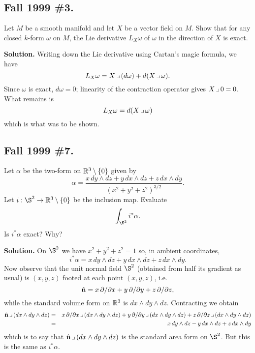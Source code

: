 \documentclass[10pt]{article}
\numberwithin{equation}{subsection}
\begin{document}
\subsection{Fall 1999 \#3.}

Let $M$ be a smooth manifold and let $X$ be a vector field on $M$.  Show that
for any closed $k$-form $\omega$ on $M$, the Lie derivative $L_X\omega$ of
$\omega$ in the direction of $X$ is exact.

\textbf{Solution.}  Writing down the Lie derivative using Cartan's magic
formula, we have
$$
	L_X\omega = X\,\lrcorner\,(d\omega) + d(X\,\lrcorner\,\omega).
$$
Since $\omega$ is exact, $d\omega=0$; linearity of the contraction operator
gives $X\,\lrcorner\, 0 = 0$.  What remains is
$$
	L_X\omega = d(X\,\lrcorner\,\omega)
$$
which is what was to be shown.

\subsection{Fall 1999 \#7.}
\label{sec:F99.7}

Let $\alpha$ be the two-form on $\mathbb{R}^3\setminus\{0\}$ given by
$$
	\alpha=\frac
		{x\,dy\wedge dz + y\,dx\wedge dz + z\,dx\wedge dy}
		{(x^2+y^2+z^2)^{3/2}}.
$$
Let $i: \S^2\to\R^3\setminus\{0\}$ be the inclusion map.  Evaluate
$$
	\int_{\S^2} i^*\alpha.
$$
Is $i^*\alpha$ exact?  Why?

\textbf{Solution.}  On $\S^2$ we have $x^2+y^2+z^2=1$ so, in ambient
coordinates,
$$
	i^*\alpha= {x\,dy\wedge dz + y\,dx\wedge dz + z\,dx\wedge dy}.
$$
Now observe that the unit normal field $\S^2$ (obtained from half its
gradient as usual) is $(x,y,z)$ footed at each point $(x,y,z)$,
i.e.
$$
	\hat{\mathbf{n}} = x\,\partial/\partial x + y\,\partial/\partial y + z\,\partial/\partial z,
$$
while the standard volume form on $\mathbb{R}^3$ is $dx\wedge dy \wedge dz$.
Contracting we obtain
\begin{eqnarray*}
	\hat{\mathbf{n}} \,\lrcorner\, (dx \wedge dy \wedge dz) &=&
		x\,\partial/\partial x \,\lrcorner\, (dx \wedge dy \wedge dz) +
		y\,\partial/\partial y \,\lrcorner\, (dx \wedge dy \wedge dz) +
		z\,\partial/\partial z \,\lrcorner\, (dx \wedge dy \wedge dz) \\
	&=&
		x\,dy \wedge dz - y\,dx \wedge dz + z\,dx \wedge dy
\end{eqnarray*}
which is to say that $\hat{\mathbf{n}} \,\lrcorner\, (dx \wedge dy \wedge dz)$ is the standard area
form on $\S^2$.  But this is the same as $i^*\alpha$.
\end{document}
